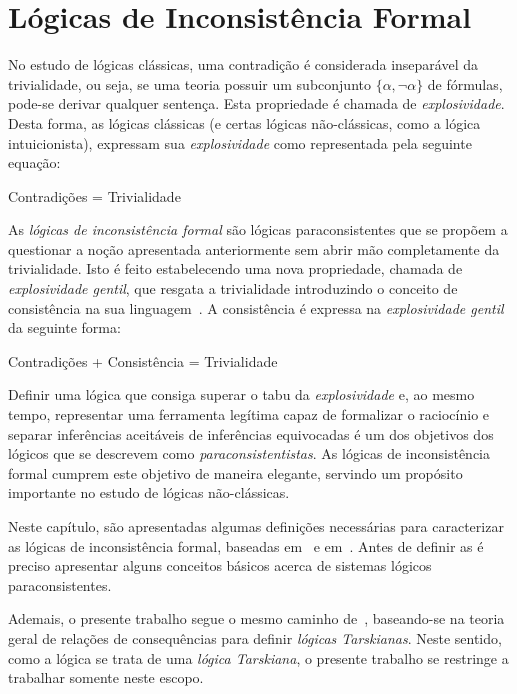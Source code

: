 \chapter{Lógicas de Inconsistência Formal}\label{cap:LFIs}
No estudo de lógicas clássicas, uma contradição é considerada inseparável da trivialidade, ou seja, se uma teoria possuir um subconjunto $\{\alpha,\neg \alpha\}$ de fórmulas, pode-se derivar qualquer sentença. Esta propriedade é chamada de \textit{explosividade}. Desta forma, as lógicas clássicas (e certas lógicas não-clássicas, como a lógica intuicionista), expressam sua \textit{explosividade} como representada pela seguinte equação:
\begin{center}
    Contradições = Trivialidade
\end{center}
As \textit{lógicas de inconsistência formal} são lógicas paraconsistentes que se propõem a questionar a noção apresentada anteriormente sem abrir mão completamente da trivialidade. Isto é feito estabelecendo uma nova propriedade, chamada de \textit{explosividade gentil}, que resgata a trivialidade introduzindo o conceito de consistência na sua linguagem~\cite{carnielli2007}. A consistência é expressa na \textit{explosividade gentil} da seguinte forma:
\begin{center}
    Contradições + Consistência = Trivialidade
\end{center}
Definir uma lógica que consiga superar o tabu da \textit{explosividade} e, ao mesmo tempo, representar uma ferramenta legítima capaz de formalizar o raciocínio e separar inferências aceitáveis de inferências equivocadas é um dos objetivos dos lógicos que se descrevem como \textit{paraconsistentistas}. As lógicas de inconsistência formal cumprem este objetivo de maneira elegante, servindo um propósito importante no estudo de lógicas não-clássicas.

Neste capítulo, são apresentadas algumas definições necessárias para caracterizar as lógicas de inconsistência formal, baseadas em~ e em~. Antes de definir as \lfis{} é preciso apresentar alguns conceitos básicos acerca de sistemas lógicos paraconsistentes.

Ademais, o presente trabalho segue o mesmo caminho de~, baseando-se na teoria geral de relações de consequências para definir \textit{lógicas Tarskianas}. Neste sentido, como a lógica \lfium{} se trata de uma \textit{lógica Tarskiana}, o presente trabalho se restringe a trabalhar somente neste escopo. 

